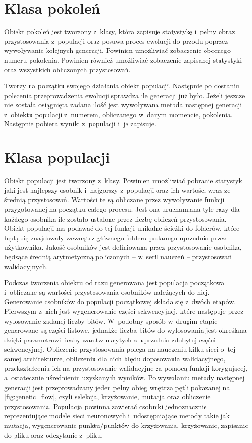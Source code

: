 \section{Klasa pokoleń}
\label{sec:generations_class}
Obiekt pokoleń jest tworzony z~klasy,
która zapisuje statystykę i~pełny obraz
przystosowania z~populacji
oraz posuwa proces ewolucji do przodu
poprzez wywoływanie kolejnych generacji.
Powinien umożliwiać zobaczenie obecnego numeru pokolenia.
Powinien również umożliwiać zobaczenie zapisanej
statystyki oraz wszystkich obliczonych przystosowań.

Tworzy na początku swojego działania obiekt populacji.
Następnie po dostaniu polecenia przeprowadzenia
ewolucji sprawdza ile generacji już było.
Jeżeli jeszcze nie została osiągnięta zadana ilość
jest wywoływana metoda następnej generacji
z~obiektu populacji z~numerem,
obliczanego w~danym momencie, pokolenia.
Następnie pobiera wyniki z~populacji i~je zapisuje.

\section{Klasa populacji}
\label{sec:population_class}
Obiekt populacji jest tworzony z~klasy.
Powinien umożliwiać pobranie statystyk jaki
jest najlepszy osobnik i~najgorszy z~populacji
oraz ich wartości wraz ze średnią przystosowań.
Wartości te są obliczane przez wywoływanie
funkcji przygotowanej na początku całego procesu.
Jest ona uruchamiana tyle razy dla każdego osobnika
ile zostało ustalone przez liczbę obliczeń przystosowania.
Obiekt populacji ma podawać do tej
funkcji unikalne ścieżki do folderów,
które będą się znajdowały wewnątrz głównego
folderu podanego uprzednio przez użytkownika.
Jakość osobników jest definiowana
przez przystosowanie osobnika,
będzące średnią arytmetyczną policzonych
-- w~serii nauczeń -- przystosowań walidacyjnych.

Podczas tworzenia obiektu od razu generowana
jest populacja początkowa i~obliczane są wartości
przystosowania osobników należących do niej.
Generowanie osobników do populacji
początkowej składa się z~dwóch etapów.
Pierwszym z~nich jest wygenerowanie części sekwencyjnej,
które następuje przez wylosowanie zadanej liczby bitów.
W~podobny sposób w~drugim etapie
generowane są części listowe,
jednakże liczba bitów do wylosowania jest
określana dzięki parametrowi liczby warstw
ukrytych z~uprzednio zdobytej części sekwencyjnej.
Obliczenie przystosowania polega na nauczeniu
kilku sieci o~tej samej architekturze,
obliczeniu dla nich błędu dopasowania walidacyjnego,
przekształceniu ich na przystosowanie walidacyjne
za pomocą funkcji korygującej,
a~ostatecznie uśrednieniu uzyskanych wyników.
Po wywołaniu metody następnej generacji
jest przeprowadzany jeden pełny obieg
wnętrza pętli pokazanej
na \cref{fig:genetic_flow},
czyli selekcja, krzyżowanie,
mutacja oraz obliczenie przystosowania.
Populacja powinna zawierać osobniki jednoznacznie
reprezentujące modele sieci neuronowych
i~udostępniające metody takie jak mutacja,
wygenerowanie punktu/punktów do krzyżowania,
krzyżowanie, zapisanie do pliku
oraz odczytanie z~pliku.

